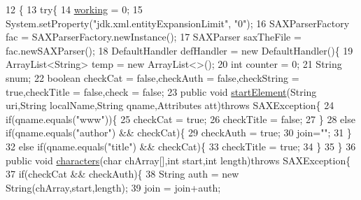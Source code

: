 \begin{DoxyCode}
12                           \{
13         \textcolor{keywordflow}{try}\{
14             \hyperlink{classXmlHandlerAuthor_a3b5ed01d09eb68532c727613932065a8}{working} = 0;
15             System.setProperty(\textcolor{stringliteral}{"jdk.xml.entityExpansionLimit"}, \textcolor{stringliteral}{"0"});
16             SAXParserFactory fac = SAXParserFactory.newInstance();
17             SAXParser saxTheFile = fac.newSAXParser();
18             DefaultHandler defHandler = \textcolor{keyword}{new} DefaultHandler()\{
19                 ArrayList<String> temp = \textcolor{keyword}{new} ArrayList<>();
20                 \textcolor{keywordtype}{int} counter = 0;
21                 String snum;
22                 \textcolor{keywordtype}{boolean} checkCat = \textcolor{keyword}{false},checkAuth = \textcolor{keyword}{false},checkString = \textcolor{keyword}{true},checkTitle = \textcolor{keyword}{false},check = \textcolor{keyword}{
      false};
23                 \textcolor{keyword}{public} \textcolor{keywordtype}{void} \hyperlink{classXmlHandlerAuthor_adac17a195135fb961bb4a8b932138152}{startElement}(String uri,String localName,String qname,Attributes 
      att)\textcolor{keywordflow}{throws} SAXException\{
24                     \textcolor{keywordflow}{if}(qname.equals(\textcolor{stringliteral}{"www"}))\{
25                         checkCat = \textcolor{keyword}{true};
26                         checkTitle = \textcolor{keyword}{false};
27                     \}
28                     \textcolor{keywordflow}{else} \textcolor{keywordflow}{if}(qname.equals(\textcolor{stringliteral}{"author"}) && checkCat)\{
29                         checkAuth = \textcolor{keyword}{true};
30                         join=\textcolor{stringliteral}{""};
31                     \}
32                     \textcolor{keywordflow}{else} \textcolor{keywordflow}{if}(qname.equals(\textcolor{stringliteral}{"title"}) && checkCat)\{
33                         checkTitle = \textcolor{keyword}{true};
34                     \}
35                 \}
36                 \textcolor{keyword}{public} \textcolor{keywordtype}{void} \hyperlink{classXmlHandlerAuthor_ad97c3844a098280d675ac0e703ac4e27}{characters}(\textcolor{keywordtype}{char} chArray[],\textcolor{keywordtype}{int} start,\textcolor{keywordtype}{int} length)\textcolor{keywordflow}{throws} SAXException\{
37                     \textcolor{keywordflow}{if}(checkCat && checkAuth)\{
38                         String auth = \textcolor{keyword}{new} String(chArray,start,length);
39                         join = join+auth;

\end{DoxyCode}
